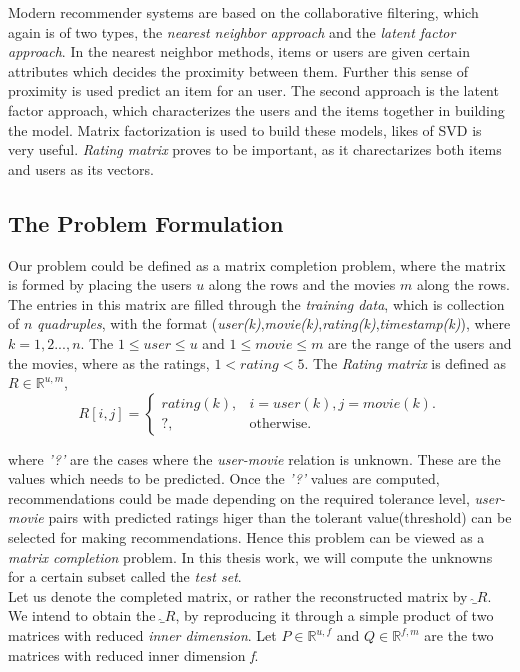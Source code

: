 Modern recommender systems are based on the collaborative filtering, which again
is of two types, the \emph{nearest neighbor approach} and the \emph{latent
factor approach}. In the nearest neighbor methods, items or users are given
certain attributes which decides the proximity between them. Further this sense
of proximity is used predict an item for an user. The second approach is
the latent factor approach, which characterizes the users and the items together
in building the model. Matrix factorization is used to build these models, likes
of SVD is very useful. \emph{Rating matrix} proves to be important, as it
charectarizes both items and users as its vectors. 

\subsection{The Problem Formulation}
Our problem could be defined as a matrix completion problem, where the matrix is
formed by placing the users $u$ along the rows and the movies $m$ along the
rows. The entries in this matrix are filled through the \emph{training data},
which is collection of $n$ \emph{quadruples}, with the format
(\emph{user(k)},\emph{movie(k)},\emph{rating(k)},\emph{timestamp(k)}), where
$k=1,2...,n$. The $1 \leq user \leq u$ and $1 \leq movie \leq m$ are the
range of the users and the movies, where as the ratings, $1<rating<5$. The
\emph{Rating
matrix} is defined as $R\in\mathbb{R}^{u,m}$, \\
\begin{equation}
  R[i,j]=\begin{cases}
    rating(k), & \text{$i=user(k), j=movie(k)$}.\\
    ?, & \text{otherwise}.
  \end{cases}
\end{equation}

where \emph{'?'} are the cases where the \emph{user-movie} relation is unknown.
These are the values which needs to be predicted. Once the \emph{'?'} values are
computed, recommendations could be made depending on the required tolerance
level, \emph{user-movie} pairs with predicted ratings higer than the tolerant
value(threshold) can be selected for making recommendations. Hence this problem
can be viewed as a \emph{matrix completion} problem. In this thesis work, we
will compute the unknowns for a certain subset called the \emph{test set}. \\

Let us denote the completed matrix, or rather the reconstructed matrix	 by
\emph{$\hat_{R}$}. We intend to obtain the
\emph{$\hat_{R}$}, by reproducing it through a simple product of two matrices
with reduced \emph{inner dimension}. Let $P\in\mathbb{R}^{u,f}$ and
$Q\in\mathbb{R}^{f,m}$ are the two matrices with reduced inner dimension
\emph{f}. 


